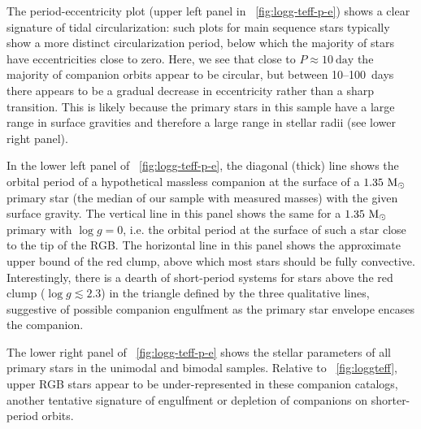 \documentclass[modern, letterpaper]{aastex62}
\newcommand{\logg}{\ensuremath{\log g}}
\begin{document}
The period-eccentricity plot (upper left panel in
\figurename~\ref{fig:logg-teff-p-e}) shows a clear signature of tidal
circularization: such plots for main sequence stars typically show a more
distinct circularization period, below which the majority of stars have
eccentricities close to zero.
Here, we see that close to $P\approx 10~\textrm{day}$ the majority of companion
orbits appear to be circular, but between 10--100~days there appears to be a
gradual decrease in eccentricity rather than a sharp transition.
This is likely because the primary stars in this sample have a large range in
surface gravities and therefore a large range in stellar radii (see lower right
panel).

In the lower left panel of \figurename~\ref{fig:logg-teff-p-e}, the diagonal
(thick) line shows the orbital period of a hypothetical massless companion at
the surface of a $1.35~\mathrm{M}_\odot$ primary star (the median of our sample with
measured masses) with the given surface gravity.
The vertical line in this panel shows the same for a $1.35~\mathrm{M}_\odot$ primary with
$\logg=0$, i.e. the orbital period at the surface of such a star close to the
tip of the RGB.
The horizontal line in this panel shows the approximate upper bound of the red
clump, above which most stars should be fully convective.
Interestingly, there is a dearth of short-period systems for stars above the red
clump ($\logg \lesssim 2.3$) in the triangle defined by the three qualitative
lines, suggestive of possible companion engulfment as the primary star envelope
encases the companion.

The lower right panel of \figurename~\ref{fig:logg-teff-p-e} shows the stellar
parameters of all primary stars in the unimodal and bimodal samples.
Relative to \figurename~\ref{fig:loggteff}, upper RGB stars appear to be
under-represented in these companion catalogs, another tentative signature of
engulfment or depletion of companions on shorter-period orbits.
\end{document}
